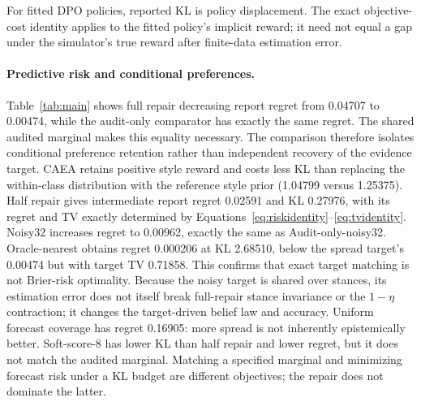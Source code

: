 \documentclass{article}
\begin{document}
For fitted DPO policies, reported KL is policy displacement. The exact
objective-cost identity applies to the fitted policy's implicit reward;
it need not equal a gap under the simulator's true reward after finite-data
estimation error.

\begin{table}[t]
\centering\small
\caption{Finite-action results: means $\pm$ 95\% Student-$t$ confidence
half-widths over ten independent runs. Style is only the style component of
Equation~\eqref{eq:rewardexperiment}, not measured human helpfulness. Target
information is given to audit-based methods. KL is relative to learned DPO.}
\label{tab:main}

\end{table}

\paragraph{Predictive risk and conditional preferences.}
Table~\ref{tab:main} shows full repair decreasing report regret from 0.04707 to
0.00474, while the audit-only comparator has exactly the same regret. The shared audited marginal makes this equality necessary. The
comparison therefore isolates conditional preference retention rather
than independent recovery of the evidence target. CAEA retains positive style reward and costs less
KL than replacing the within-class distribution with the reference style
prior (1.04799 versus 1.25375). Half repair
gives intermediate report regret 0.02591 and KL 0.27976, with its regret and TV exactly determined by Equations~\eqref{eq:riskidentity}--\eqref{eq:tvidentity}. Noisy32 increases regret to 0.00962, exactly the same as Audit-only-noisy32. Oracle-nearest obtains regret 0.000206 at KL 2.68510, below the spread target's 0.00474 but with target TV 0.71858. This confirms that exact target matching is not Brier-risk optimality. Because the noisy target is shared over stances, its estimation error does not itself break full-repair stance invariance or the $1-\eta$ contraction; it changes the target-driven belief law and accuracy. Uniform forecast coverage has regret 0.16905:
more spread is not inherently epistemically better. Soft-score-8 has lower KL
than half repair and lower regret, but it does not match the audited marginal.
Matching a specified marginal and minimizing forecast risk under a KL
budget are different objectives; the repair does not dominate the latter.



\begin{table}[t]
\centering\small
\caption{Exploratory paired uncertainty over contexts and label seeds.
Report difference is Head-DPO minus LM-base (negative is better);
style difference is CAEA-1 minus Audit-only (positive is better).
Intervals are percentile bootstrap intervals, not the seed-only
Student-$t$ half-widths in the supplementary seed-only table.}
\label{tab:paired}

\end{table}
\end{document}
